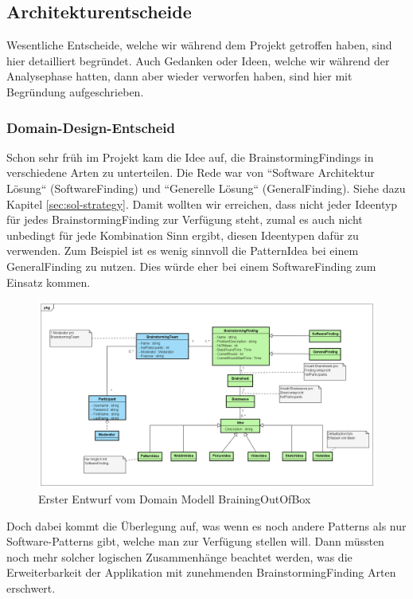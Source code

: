 \subsection{Architekturentscheide}
Wesentliche Entscheide, welche wir während dem Projekt getroffen haben, sind hier detailliert begründet. Auch Gedanken oder Ideen, welche wir während der Analysephase hatten, dann aber wieder verworfen haben, sind hier mit Begründung aufgeschrieben.

\subsubsection{Domain-Design-Entscheid}
Schon sehr früh im Projekt kam die Idee auf, die BrainstormingFindings in verschiedene Arten zu unterteilen. Die Rede war von ``Software Architektur Lösung`` (SoftwareFinding) und ``Generelle Lösung`` (GeneralFinding). Siehe dazu Kapitel \ref{sec:sol-strategy}. Damit wollten wir erreichen, dass nicht jeder Ideentyp für jedes BrainstormingFinding zur Verfügung steht, zumal es auch nicht unbedingt für jede Kombination Sinn ergibt, diesen Ideentypen dafür zu verwenden. Zum Beispiel ist es wenig sinnvoll die PatternIdea bei einem GeneralFinding zu nutzen. Dies würde eher bei einem SoftwareFinding zum Einsatz kommen.

\begin{figure}[h]
	\centering
	\includegraphics[width=1\linewidth]{img/domain-analyse/DomainModell-Methode635-Entwurf}
	\caption{Erster Entwurf vom Domain Modell BrainingOutOfBox}
	\label{fig:domainmodell-methode635-entwurf}
\end{figure}

Doch dabei kommt die Überlegung auf, was wenn es noch andere Patterns als nur Software-Patterns gibt, welche man zur Verfügung stellen will. Dann müssten noch mehr solcher logischen Zusammenhänge beachtet werden, was die Erweiterbarkeit der Applikation mit zunehmenden BrainstormingFinding Arten erschwert.

